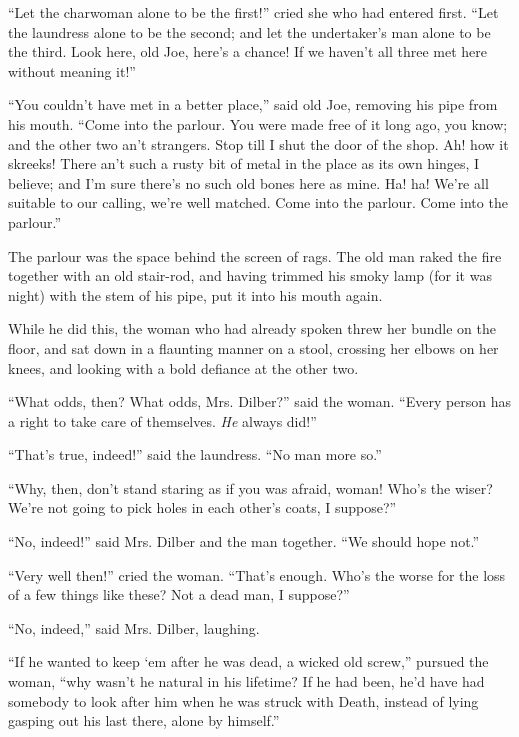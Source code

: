 \documentclass[paper=5.5in:8.5in,BCOR=15mm,twoside,DIV=15,headinclude=off,12pt,chapterprefix=off,openany,headings=huge]{scrbook} %
\begin{document}
\enquote{Let the charwoman alone to be the first!} cried she who had entered first. \enquote{Let the laundress alone to be the second; and let the undertaker's man alone to be the third. Look here, old Joe, here's a chance! If we haven't all three met here without meaning it!}

\enquote{You couldn't have met in a better place,} said old Joe, removing his pipe from his mouth. \enquote{Come into the parlour. You were made free of it long ago, you know; and the other two an't strangers. Stop till I shut the door of the shop. Ah! how it skreeks! There an't such a rusty bit of metal in the place as its own hinges, I believe; and I'm sure there's no such old bones here as mine. Ha! ha! We're all suitable to our calling, we're well matched. Come into the parlour. Come into the parlour.}

The parlour was the space behind the screen of rags. The old man raked the fire together with an old stair-rod, and having trimmed his smoky lamp (for it was night) with the stem of his pipe, put it into his mouth again.

While he did this, the woman who had already spoken threw her bundle on the floor, and sat down in a flaunting manner on a stool, crossing her elbows on her knees, and looking with a bold defiance at the other two.

\enquote{What odds, then? What odds, Mrs. Dilber?} said the woman. \enquote{Every person has a right to take care of themselves. \textit{He} always did!}

\enquote{That's true, indeed!} said the laundress. \enquote{No man more so.}

\enquote{Why, then, don't stand staring as if you was afraid, woman! Who's the wiser? We're not going to pick holes in each other's coats, I suppose?}

\enquote{No, indeed!} said Mrs. Dilber and the man together. \enquote{We should hope not.}

\enquote{Very well then!} cried the woman. \enquote{That's enough. Who's the worse for the loss of a few things like these? Not a dead man, I suppose?}

\enquote{No, indeed,} said Mrs. Dilber, laughing.

\enquote{If he wanted to keep `em after he was dead, a wicked old screw,} pursued the woman, \enquote{why wasn't he natural in his lifetime? If he had been, he'd have had somebody to look after him when he was struck with Death, instead of lying gasping out his last there, alone by himself.}
\end{document}
